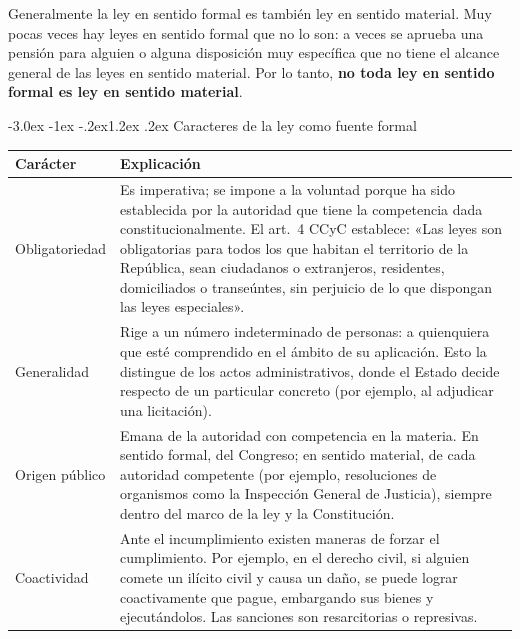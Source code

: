 \documentclass[12pt,oneside]{book}
\makeatletter
\renewcommand\section{\@startsection{section}{1}{\z@}%
  {-3.0ex \@plus -1ex \@minus -.2ex}{1.2ex \@plus .2ex}%
  {\normalfont\large\bfseries\color{acento}}}
\makeatother
\begin{document}
Generalmente la ley en sentido formal es también ley en sentido material. Muy pocas veces hay leyes en sentido formal que no lo son: a veces se aprueba una pensión para alguien o alguna disposición muy específica que no tiene el alcance general de las leyes en sentido material. Por lo tanto, \textbf{no toda ley en sentido formal es ley en sentido material}.

\section{Caracteres de la ley como fuente formal}

\begin{table}[H]
\centering
\begin{tabularx}{\textwidth}{>{\raggedright\arraybackslash}p{} >{\raggedright\arraybackslash}X}
\toprule
\textbf{Carácter} & \textbf{Explicación} \\
\midrule
Obligatoriedad &
Es imperativa; se impone a la voluntad porque ha sido establecida por la autoridad que tiene la competencia dada constitucionalmente. El art.~4 CCyC establece: «Las leyes son obligatorias para todos los que habitan el territorio de la República, sean ciudadanos o extranjeros, residentes, domiciliados o transeúntes, sin perjuicio de lo que dispongan las leyes especiales». \\
\addlinespace
Generalidad &
Rige a un número indeterminado de personas: a quienquiera que esté comprendido en el ámbito de su aplicación. Esto la distingue de los actos administrativos, donde el Estado decide respecto de un particular concreto (por ejemplo, al adjudicar una licitación). \\
\addlinespace
Origen público &
Emana de la autoridad con competencia en la materia. En sentido formal, del Congreso; en sentido material, de cada autoridad competente (por ejemplo, resoluciones de organismos como la Inspección General de Justicia), siempre dentro del marco de la ley y la Constitución. \\
\addlinespace
Coactividad &
Ante el incumplimiento existen maneras de forzar el cumplimiento. Por ejemplo, en el derecho civil, si alguien comete un ilícito civil y causa un daño, se puede lograr coactivamente que pague, embargando sus bienes y ejecutándolos. Las sanciones son resarcitorias o represivas. \\
\bottomrule
\end{tabularx}
\end{table}
\end{document}
